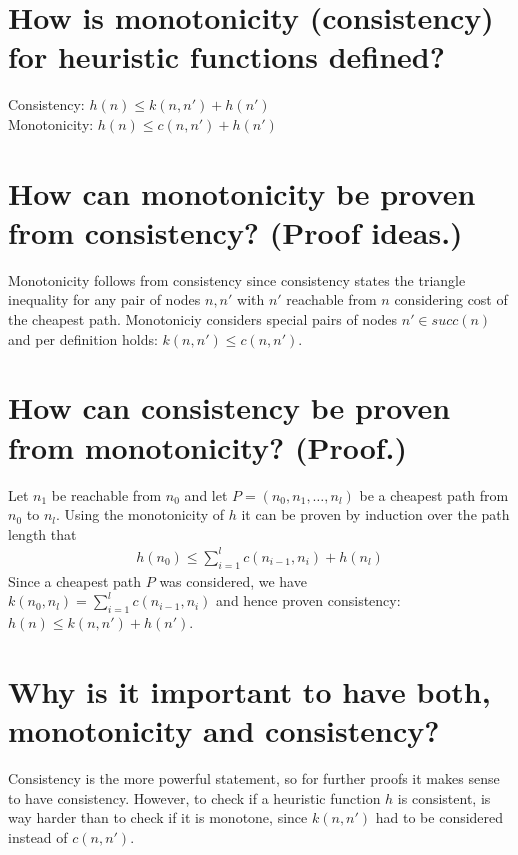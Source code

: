 \documentclass[12pt, a4paper]{article}
\begin{document}
\section{How is monotonicity (consistency) for heuristic functions defined?}
Consistency: $h(n) \leq k(n, n') + h(n')$ \\
Monotonicity: $h(n) \leq c(n, n') + h(n')$

\section{How can monotonicity be proven from consistency? (Proof ideas.)}
Monotonicity follows from consistency since consistency states the triangle inequality for any pair of nodes $n, n'$ with $n'$ reachable from $n$ considering cost of the cheapest path. Monotoniciy considers special pairs of nodes $n' \in succ(n)$ and per definition holds: $k(n, n') \leq c(n, n')$.

\section{How can consistency be proven from monotonicity? (Proof.)}
Let $n_1$ be reachable from $n_0$ and let $P = (n_0, n_1, \ldots, n_l)$ be a cheapest path from $n_0$ to $n_l$. Using the monotonicity of $h$ it can be proven by induction over the path length that 
\begin{align*}
h(n_0) \leq \sum_{i=1}^l c(n_{i-1}, n_i) + h(n_l)
\end{align*}
Since a cheapest path $P$ was considered, we have $k(n_0, n_l) = \sum_{i=1}^{l} c(n_{i-1}, n_i)$ and hence proven consistency: $h(n) \leq k(n, n') + h(n')$.

\section{Why is it important to have both, monotonicity and consistency?}
Consistency is the more powerful statement, so for further proofs it makes sense to have consistency. However, to check if a heuristic function $h$ is consistent, is way harder than to check if it is monotone, since $k(n, n')$ had to be considered instead of $c(n, n')$. 
\end{document}
